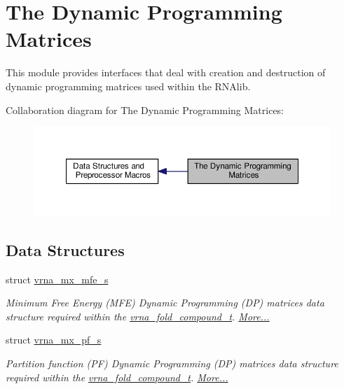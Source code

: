 \hypertarget{group__dp__matrices}{\section{The Dynamic Programming Matrices}
\label{group__dp__matrices}
}


This module provides interfaces that deal with creation and destruction of dynamic programming matrices used within the R\-N\-Alib.  


Collaboration diagram for The Dynamic Programming Matrices\-:
\nopagebreak
\begin{figure}[H]
\begin{center}
\leavevmode
\includegraphics[width=350pt]{group__dp__matrices}
\end{center}
\end{figure}
\subsection*{Data Structures}
\begin{DoxyCompactItemize}
\item 
struct \hyperlink{group__dp__matrices_structvrna__mx__mfe__s}{vrna\-\_\-mx\-\_\-mfe\-\_\-s}
\begin{DoxyCompactList}\small\item\em Minimum Free Energy (M\-F\-E) Dynamic Programming (D\-P) matrices data structure required within the \hyperlink{group__fold__compound_ga1b0cef17fd40466cef5968eaeeff6166}{vrna\-\_\-fold\-\_\-compound\-\_\-t}.  \hyperlink{group__dp__matrices_structvrna__mx__mfe__s}{More...}\end{DoxyCompactList}\item 
struct \hyperlink{group__dp__matrices_structvrna__mx__pf__s}{vrna\-\_\-mx\-\_\-pf\-\_\-s}
\begin{DoxyCompactList}\small\item\em Partition function (P\-F) Dynamic Programming (D\-P) matrices data structure required within the \hyperlink{group__fold__compound_ga1b0cef17fd40466cef5968eaeeff6166}{vrna\-\_\-fold\-\_\-compound\-\_\-t}.  \hyperlink{group__dp__matrices_structvrna__mx__pf__s}{More...}\end{DoxyCompactList}\end{DoxyCompactItemize}
